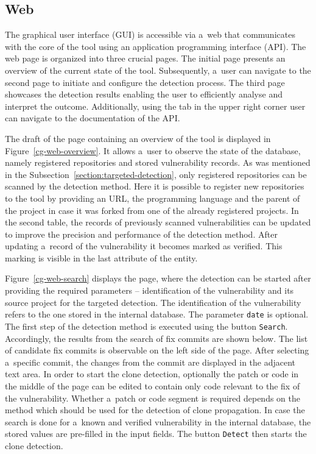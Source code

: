   \subsection*{Web}
  The graphical user interface (GUI) is accessible via a~web that communicates with the core of the tool
  using an application programming interface (API).
  The web page is organized into three crucial pages. The initial page presents an overview of the current state of the tool.
  Subsequently, a~user can navigate to the second page to initiate and configure the detection process.
  The third page showcases the detection results enabling the user to efficiently analyse and interpret the outcome.
  Additionally, using the tab in the upper right corner user can navigate to the documentation of the API.

  The draft of the page containing an overview of the tool is displayed in Figure~\ref{cg-web-overview}.
  It allows a~user to observe the state of the database, namely registered repositories and stored vulnerability
  records. As was mentioned in the Subsection~\ref{section:targeted-detection}, only registered repositories can be scanned
  by the detection method. Here it is possible to register new repositories to the tool by providing an URL,
  the programming language and the parent of the project in case it was forked from one of the already registered projects. In the second table, the records of previously
  scanned vulnerabilities can be updated to improve the precision and performance of the detection method.
  After updating a~record of the vulnerability it becomes marked as verified. This marking is visible in the last attribute
  of the entity.

  Figure~\ref{cg-web-search} displays the page, where the detection can be started after providing the required
  parameters -- identification of the vulnerability and its source project for the targeted detection.
  The identification of the vulnerability refers to the one stored in the internal database. The parameter \texttt{date}
  is optional. The first step of the detection method is executed using the button \texttt{Search}.
  Accordingly, the results from the search of fix commits are shown below. The list of candidate fix commits is observable
  on the left side of the page. After selecting a~specific commit, the changes from the commit are displayed in the adjacent
  text area. In order to start the clone detection, optionally the patch or code in the middle
  of the page can be edited to contain only code relevant to the fix of the vulnerability. Whether a~patch or code
  segment is required depends on the method which should be used for the detection of clone propagation. In case the search
  is done for a~known and verified vulnerability in the internal database, the stored values are pre-filled in the input
  fields. The button \texttt{Detect} then starts the clone detection.

